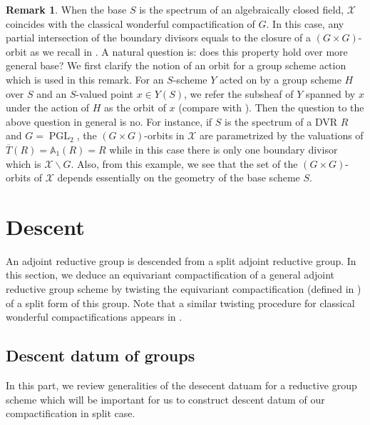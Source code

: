 \documentclass[11pt, reqno]{amsart}
\theoremstyle{plain}
\theoremstyle{definition}
\newtheorem{remark}[theorem]{Remark}
\DeclareMathOperator{\PGL}{PGL}		%
\begin{document}
\begin{remark}
    When the base $S$ is the spectrum of an algebraically closed field, $\mathcal{X}$ coincides with the classical wonderful compactification of $G$. In this case, any partial intersection of the boundary divisors equals to the closure of a $(G\times G)$-orbit as we recall in . A natural question is: does this property hold over more general base? We first clarify the notion of an orbit for a group scheme action which is
used in this remark. For an $S$-scheme $Y$ acted on by a group scheme $H$ over $S$ and an $S$-valued
point $x\in Y(S)$, we refer the subsheaf of $Y$ spanned by $x$ under the action of $H$ as the orbit of
$x$ (compare with \cite[Definition~0.4]{GIT}). Then the question to the above question in general is no. For instance, if $S$ is the spectrum of a DVR $R$ and $G=\PGL_2$, the $(G\times G)$-orbits in $\mathcal{X}$ are parametrized by the valuations of $\overline{T}(R)=\mathbb{A}_1(R)=R$ while in this case there is only one boundary divisor which is $\mathcal{X}\backslash G$. Also, from this example, we see that the set of the $(G\times G)$-orbits of $\mathcal{X}$ depends essentially on the geometry of the base scheme $S$.
\end{remark}








\section{Descent}\label{sectiondescent}
An adjoint reductive group is descended from a split adjoint reductive group. In this section, we deduce an equivariant compactification of a general adjoint reductive group scheme by twisting the equivariant compactification (defined in ) of a split form of this group. Note that a similar twisting procedure for classical wonderful compactifications appears in \cite[5.5]{twistingwonderfulcompacctification}.

\subsection{Descent datum of groups}
In this part, we review generalities of the desecent datuam for a reductive group scheme which will be important for us to construct descent datum of our compactification in split case.
\end{document}
